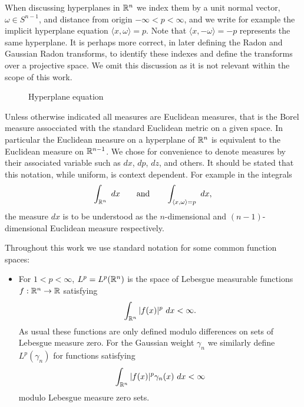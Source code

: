 \begin{notationpage}
When discussing hyperplanes in $\mathbb{R}^n$ we index them by a unit normal vector, $\omega \in S^{n-1}$, and distance from origin $-\infty < p < \infty$, and we write for example the implicit hyperplane equation $\langle x, \omega \rangle = p$. Note that $\langle x, -\omega \rangle = -p$ represents the same hyperplane. It is perhaps more correct, in later defining the Radon and Gaussian Radon transforms, to identify these indexes and define the transforms over a projective space. We omit this discussion as it is not relevant within the scope of this work.
\begin{figure}[h]
  \centering
  \caption{Hyperplane equation}\label{fig:HypEq}
\end{figure}

Unless otherwise indicated all measures are Euclidean measures, that is the Borel measure assocciated with the standard Euclidean metric on a given space. In particular the Euclidean measure on a hyperplane of $\mathbb{R}^n$ is equivalent to the Euclidean measure on $\mathbb{R}^{n-1}$. We chose for convenience to denote measures by their associated variable such as $dx$, $dp$, $dz$, and others. It should be stated that this notation, while uniform, is context dependent. For example in the integrals
\[
  \int_{\mathbb{R}^n}~dx \qquad \text{and} \qquad \int_{\langle x, \omega\rangle = p} ~dx,
\]
the measure $dx$ is to be understood as the $n$-dimensional and $(n-1)$-dimensional Euclidean measure respectively.

Throughout this work we use standard notation for some common function spaces:

\begin{itemize}
  \item For $1 < p < \infty$, $L^p = L^p(\mathbb{R}^n)$ is the space of Lebesgue measurable functions $f : \mathbb{R}^n \to \mathbb{R}$ satisfying
  \[
    \int_{\mathbb{R}^n} |f(x)|^p ~dx < \infty.
  \]
  As usual these functions are only defined modulo differences on sets of Lebesgue measure zero. For the Gaussian weight $\gamma_n$ we similarly define $L^p(\gamma_n)$ for functions satisfying
  \[
    \int_{\mathbb{R}^n} |f(x)|^p \gamma_n(x) ~dx < \infty
  \]
  modulo Lebesgue measure zero sets.


\end{itemize}
\end{notationpage}
